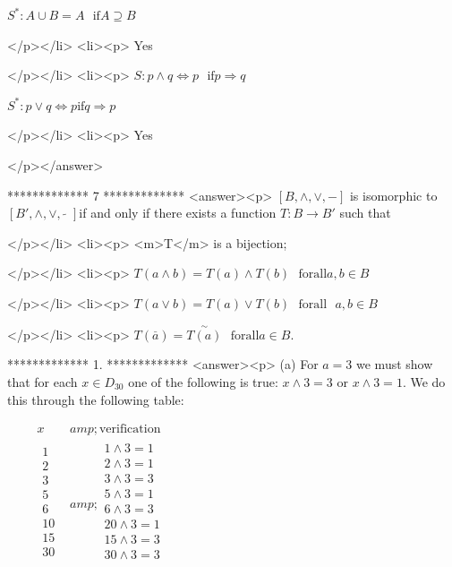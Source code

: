 \(S^*:A \cup B = A\text{  }\text{if} A \supseteq B\)

</p></li>
<li><p> Yes

</p></li>
<li><p> \(S:p \land q\Leftrightarrow p\text{   }\text{if} p\Rightarrow q\)



\(S^*:p \lor q\Leftrightarrow p \text{if} q\Rightarrow p\)

</p></li>
<li><p> Yes

</p></answer>


*************
7
*************
<answer><p>  \([B, \land , \lor , -]\) is isomorphic to \(\left[B',\land ,\lor , \tilde{\text{  }}\right]\)if
and only if there exists a  function \(T:B \to  B'\) such that 

</p></li>
<li><p> <m>T</m> is a bijection;

</p></li>
<li><p> \(T(a\land b)=T(a)\land T(b)\text{  }\text{for} \text{all} a,b\in B\)

</p></li>
<li><p> \(T(a\lor b)=T(a)\lor T(b)\text{  }\text{for} \text{all}\text{  }a, b \in B\)

</p></li>
<li><p> \(T\left(\overset{\pmb{\_}}{a}\right)=\overset{\sim }{T(a)}\text{  }\text{for} \text{all} a\in B\).



*************
1.
*************
<answer><p> (a) For \(a = 3\) we must show that for each \(x \in  D_{30}\)  one of the following is true: \(x\land 3=3\) or \(x\land 3=1\).  We do this
through the following table:



$\quad \quad $\(\begin{array}{cc}
 x &amp; \text{verification} \\
\hline
 
\begin{array}{c}
 1 \\
 2 \\
 3 \\
 5 \\
 6 \\
 10 \\
 15 \\
 30 \\
\end{array}
 &amp; 
\begin{array}{c}
 1\land 3=1 \\
 2\land 3=1 \\
 3\land 3=3 \\
 5\land 3=1 \\
 6\land 3=3 \\
 20\land 3=1 \\
 15\land 3=3 \\
 30\land 3=3 \\
\end{array}
 \\
\end{array}\)



